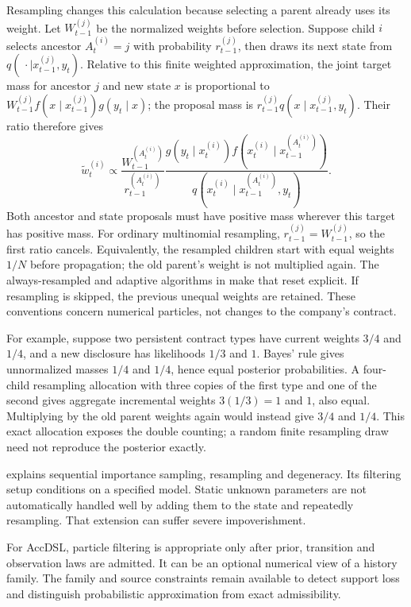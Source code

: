 Resampling changes this calculation because selecting a parent already uses its weight. Let $W_{t-1}^{(j)}$ be the normalized weights before selection. Suppose child $i$ selects ancestor $A_t^{(i)}=j$ with probability $r_{t-1}^{(j)}$, then draws its next state from $q(\,\cdot\mid x_{t-1}^{(j)},y_t)$. Relative to this finite weighted approximation, the joint target mass for ancestor $j$ and new state $x$ is proportional to $W_{t-1}^{(j)} f(x\mid x_{t-1}^{(j)})g(y_t\mid x)$; the proposal mass is $r_{t-1}^{(j)}q(x\mid x_{t-1}^{(j)},y_t)$. Their ratio therefore gives
\begin{equation}
 \widetilde w_t^{(i)}\propto
 \frac{W_{t-1}^{(A_t^{(i)})}}{r_{t-1}^{(A_t^{(i)})}}
 \frac{g(y_t\mid x_t^{(i)})f(x_t^{(i)}\mid x_{t-1}^{(A_t^{(i)})})}
 {q(x_t^{(i)}\mid x_{t-1}^{(A_t^{(i)})},y_t)}.
\end{equation}
Both ancestor and state proposals must have positive mass wherever this target has positive mass. For ordinary multinomial resampling, $r_{t-1}^{(j)}=W_{t-1}^{(j)}$, so the first ratio cancels. Equivalently, the resampled children start with equal weights $1/N$ before propagation; the old parent's weight is not multiplied again. The always-resampled and adaptive algorithms in \citet[Sections 3.4--3.5]{doucet2012tutorial} make that reset explicit. If resampling is skipped, the previous unequal weights are retained. These conventions concern numerical particles, not changes to the company's contract.

For example, suppose two persistent contract types have current weights $3/4$ and $1/4$, and a new disclosure has likelihoods $1/3$ and $1$. Bayes' rule gives unnormalized masses $1/4$ and $1/4$, hence equal posterior probabilities. A four-child resampling allocation with three copies of the first type and one of the second gives aggregate incremental weights $3(1/3)=1$ and $1$, also equal. Multiplying by the old parent weights again would instead give $3/4$ and $1/4$. This exact allocation exposes the double counting; a random finite resampling draw need not reproduce the posterior exactly.

\citet[Sections 2--3]{doucet2012tutorial} explains sequential importance sampling, resampling and degeneracy. Its filtering setup conditions on a specified model. Static unknown parameters are not automatically handled well by adding them to the state and repeatedly resampling. That extension can suffer severe impoverishment.

For AccDSL, particle filtering is appropriate only after prior, transition and observation laws are admitted. It can be an optional numerical view of a history family. The family and source constraints remain available to detect support loss and distinguish probabilistic approximation from exact admissibility.

